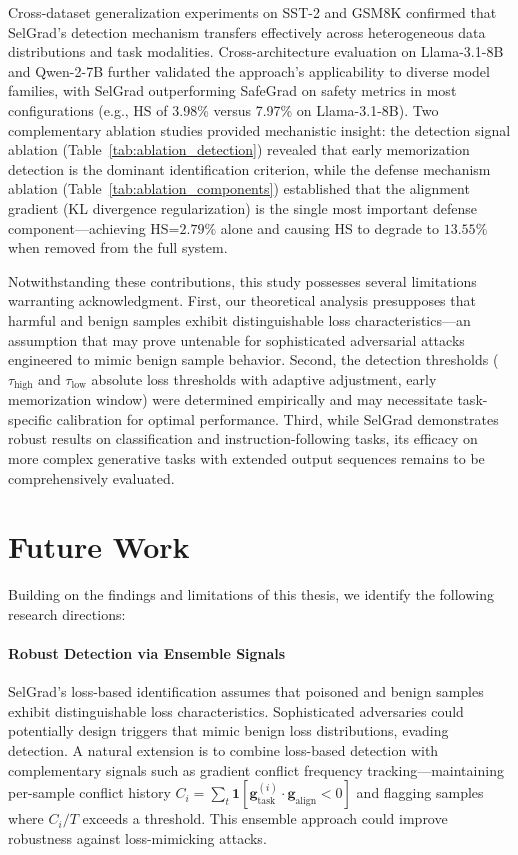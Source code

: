 Cross-dataset generalization experiments on SST-2 and GSM8K confirmed that SelGrad's detection mechanism transfers effectively across heterogeneous data distributions and task modalities. Cross-architecture evaluation on Llama-3.1-8B and Qwen-2-7B further validated the approach's applicability to diverse model families, with SelGrad outperforming SafeGrad on safety metrics in most configurations (e.g., HS of 3.98\% versus 7.97\% on Llama-3.1-8B). Two complementary ablation studies provided mechanistic insight: the detection signal ablation (Table~\ref{tab:ablation_detection}) revealed that early memorization detection is the dominant identification criterion, while the defense mechanism ablation (Table~\ref{tab:ablation_components}) established that the alignment gradient (KL divergence regularization) is the single most important defense component---achieving HS=$2.79\%$ alone and causing HS to degrade to $13.55\%$ when removed from the full system.

Notwithstanding these contributions, this study possesses several limitations warranting acknowledgment. First, our theoretical analysis presupposes that harmful and benign samples exhibit distinguishable loss characteristics---an assumption that may prove untenable for sophisticated adversarial attacks engineered to mimic benign sample behavior. Second, the detection thresholds ($\tau_{\text{high}}$ and $\tau_{\text{low}}$ absolute loss thresholds with adaptive adjustment, early memorization window) were determined empirically and may necessitate task-specific calibration for optimal performance. Third, while SelGrad demonstrates robust results on classification and instruction-following tasks, its efficacy on more complex generative tasks with extended output sequences remains to be comprehensively evaluated.

\section{Future Work}

Building on the findings and limitations of this thesis, we identify the following research directions:

\paragraph{Robust Detection via Ensemble Signals}
SelGrad's loss-based identification assumes that poisoned and benign samples exhibit distinguishable loss characteristics. Sophisticated adversaries could potentially design triggers that mimic benign loss distributions, evading detection. A natural extension is to combine loss-based detection with complementary signals such as gradient conflict frequency tracking---maintaining per-sample conflict history $C_i = \sum_{t} \mathbf{1}[\mathbf{g}_{\text{task}}^{(i)} \cdot \mathbf{g}_{\text{align}} < 0]$ and flagging samples where $C_i / T$ exceeds a threshold. This ensemble approach could improve robustness against loss-mimicking attacks.

